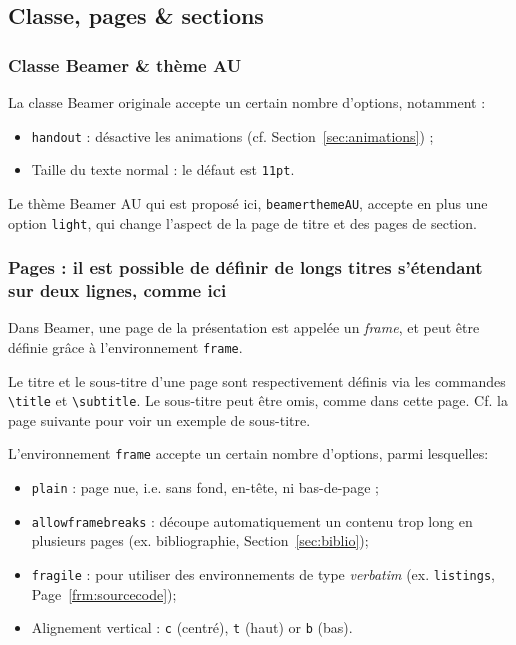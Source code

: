 \documentclass[10pt,    %
    french,             %
    xcolor=table,       %
    envcountsect        %
]{beamer}
\begin{document}
\subsection{Classe, pages \& sections}
\begin{frame}
    \frametitle{Classe Beamer \& thème AU}
    
    La classe Beamer originale accepte un certain nombre d'options, notamment :
    \begin{itemize}
        \item \texttt{handout} : désactive les animations (cf. Section~\ref{sec:animations}) ;
        \item Taille du texte normal : le défaut est \texttt{11pt}.
    \end{itemize}

    \vspace{0.25cm}
    Le thème Beamer AU qui est proposé ici, \texttt{beamerthemeAU}, accepte en plus une option \texttt{light}, qui change l'aspect de la page de titre et des pages de section.
\end{frame}

\begin{frame}
    \frametitle{Pages : il est possible de définir de longs titres s'étendant sur deux lignes, comme ici} 
    
    Dans Beamer, une page de la présentation est appelée un \textit{frame}, et peut être définie grâce à l'environnement \texttt{frame}.
    
    \vspace{0.25cm}
    Le titre et le sous-titre d'une page sont respectivement définis via les commandes \texttt{\textbackslash{}title} et \texttt{\textbackslash{}subtitle}. Le sous-titre peut être omis, comme dans cette page. Cf. la page suivante pour voir un exemple de sous-titre.
    
    \vspace{0.25cm}
    L'environnement \texttt{frame} accepte un certain nombre d'options, parmi lesquelles: 
    \begin{itemize}
        \item \texttt{plain} : page nue, i.e. sans fond, en-tête, ni bas-de-page ;
        \item \texttt{allowframebreaks} : découpe automatiquement un contenu trop long en plusieurs pages (ex. bibliographie, Section~\ref{sec:biblio});
        \item \texttt{fragile} : pour utiliser des environnements de type \textit{verbatim} (ex. \texttt{listings}, Page~\ref{frm:sourcecode});
        \item Alignement vertical : \texttt{c} (centré), \texttt{t} (haut) or \texttt{b} (bas).
    \end{itemize}
\end{frame}
\end{document}
